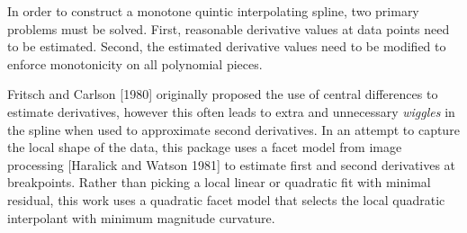 

In order to construct a monotone quintic interpolating spline, two
primary problems must be solved. First, reasonable derivative values
at data points need to be estimated. Second, the estimated derivative
values need to be modified to enforce monotonicity on all polynomial
pieces.

Fritsch and Carlson [1980] originally proposed the use of central differences
to estimate derivatives, however this often leads to extra and unnecessary
{\it wiggles} in the spline when used to approximate second derivatives.
In an attempt to capture the local shape of the data, this package uses a
facet model from image processing [Haralick and Watson 1981] to estimate
first and second derivatives at breakpoints. Rather than picking a local
linear or quadratic fit with minimal residual, this work uses a quadratic
facet model that selects the local quadratic interpolant with minimum
magnitude curvature.

